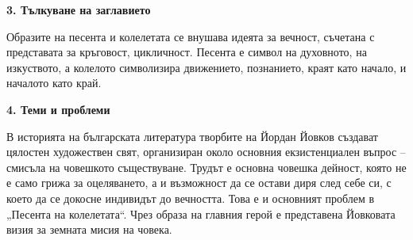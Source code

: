 \documentclass[12pt,a4paper]{article}
\begin{document}
\vspace{0.1cm}
\noindent
\textbf{3. Тълкуване на заглавието}
\vspace{0.1cm}

\indent Образите на песента и колелетата се внушава идеята за вечност, съчетана с представата за кръговост, цикличност. Песента е символ на духовното, на изкуството, а колелото символизира движението, познанието, краят като начало, и началото като край.

\vspace{0.1cm}
\noindent
\textbf{4. Теми и проблеми}
\vspace{0.1cm}

\indent В историята на българската литература творбите на Йордан Йовков създават цялостен художествен свят, организиран около основния екзистенциален въпрос -- смисъла на човешкото съществуване. Трудът е основна човешка дейност, която не е само грижа за оцеляването, а и възможност да се остави диря след себе си, с което да се докосне индивидът до вечността. Това е и основният проблем в „Песента на колелетата“. Чрез образа на главния герой е представена Йовковата визия за земната мисия на човека.
\end{document}
